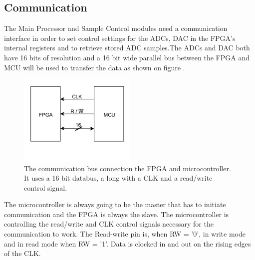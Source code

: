 \subsection{Communication} \label{subsec:Communication}
The Main Processor and Sample Control modules need a communication interface in order to set control settings for the ADCs, DAC in the FPGA's internal registers and to retrieve stored ADC samples.The ADCs and DAC  both have 16 bits of resolution and a 16 bit wide parallel bus between the FPGA and MCU will be used to transfer the data as shown on figure .

\begin{figure}[H]
    \centering
    \includegraphics[clip, trim=0 100 0 0, width=0.5\textwidth]{Sections/7_SystemDesign/Figures/7_2_1_CommunicationBus.pdf}
    \caption{The communication bus connection the FPGA and microcontroller. It uses a 16 bit databus, a long with a CLK and a read/write control signal.}
    \label{fig_7_2_1_CommBus}
\end{figure}

The microcontroller is always going to be the master that has to initiate communication and the FPGA is always the slave. The microcontroller is controlling the read/write and CLK control signals necessary for the communication to work. The Read-write pin is, when  RW = '0', in write mode and in read mode when RW = '1'. Data is clocked in and out on the rising edges of the CLK. 

